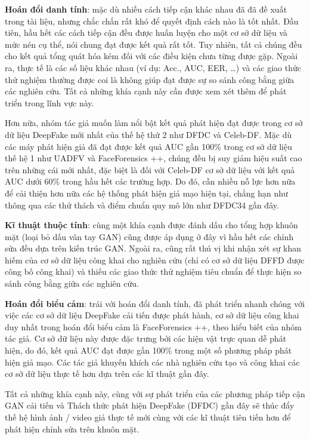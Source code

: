 \documentclass{article}
\begin{document}
\textbf{Hoán đổi danh tính}: mặc dù nhiều cách tiếp cận khác nhau đã đã đề xuất trong tài liệu, nhưng chắc chắn rất khó để quyết định cách nào là tốt nhất. Đầu tiên, hầu hết các cách tiếp cận đều được huấn luyện cho một cơ sở dữ liệu và mức nén cụ thể, nói chung đạt được kết quả rất tốt. Tuy nhiên, tất cả chúng đều cho kết quả tổng quát hóa kém đối với các điều kiện chưa từng được gặp. Ngoài ra, thực tế là các số liệu khác nhau (ví dụ: Acc., AUC, EER, …) và các giao thức thử nghiệm thường được coi là không giúp đạt được sự so sánh công bằng giữa các nghiên cứu. Tất cả những khía cạnh này cần được xem xét thêm để phát triển trong lĩnh vực này.

Hơn nữa, nhóm tác giả muốn làm nổi bật kết quả phát hiện đạt được trong cơ sở dữ liệu DeepFake mới nhất của thế hệ thứ 2 như DFDC và Celeb-DF. Mặc dù các máy phát hiện giả đã đạt được kết quả AUC gần 100\% trong cơ sở dữ liệu thế hệ 1 như UADFV và FaceForensics ++, chúng đều bị suy giảm hiệu suất cao trên những cái mới nhất, đặc biệt là đối với Celeb-DF cơ sở dữ liệu với kết quả AUC dưới 60\% trong hầu hết các trường hợp. Do đó, cần nhiều nỗ lực hơn nữa để cải thiện hơn nữa các hệ thống phát hiện giả mạo hiện tại, chẳng hạn như thông qua các thử thách và điểm chuẩn quy mô lớn như DFDC34 gần đây.

\textbf{Kĩ thuật thuộc tính}: cùng một khía cạnh được đánh dấu cho tổng hợp khuôn mặt (loại bỏ dấu vân tay GAN) cũng được áp dụng ở đây vì hầu hết các chỉnh sửa đều dựa trên kiến trúc GAN. Ngoài ra, cũng rất thú vị khi nhận xét sự khan hiếm của cơ sở dữ liệu công khai cho nghiên cứu (chỉ có cơ sở dữ liệu DFFD được công bố công khai) và thiếu các giao thức thử nghiệm tiêu chuẩn để thực hiện so sánh công bằng giữa các nghiên cứu.

\textbf{Hoán đổi biểu cảm}: trái với hoán đổi danh tính, đã phát triển nhanh chóng với việc các cơ sở dữ liệu DeepFake cải tiến được phát hành, cơ sở dữ liệu công khai duy nhất trong hoán đổi biểu cảm là FaceForensics ++, theo hiểu biết của nhóm tác giả. Cơ sở dữ liệu này được đặc trưng bởi các hiện vật trực quan dễ phát hiện, do đó, kết quả AUC đạt được gần 100\% trong một số phương pháp phát hiện giả mạo. Các tác giả khuyến khích các nhà nghiên cứu tạo và công khai các cơ sở dữ liệu thực tế hơn dựa trên các kĩ thuật gần đây.

Tất cả những khía cạnh này, cùng với sự phát triển của các phương pháp tiếp cận GAN cải tiến và Thách thức phát hiện DeepFake (DFDC) gần đây sẽ thúc đẩy thế hệ hình ảnh / video giả thực tế mới cùng với các kĩ thuật tiên tiến hơn để phát hiện chỉnh sửa trên khuôn mặt.



\end{document}

